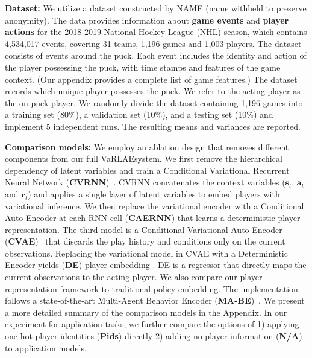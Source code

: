 \documentclass[letterpaper]{article} %
\newcommand{\state}{\mathbf{s}}
\newcommand{\action}{\mathbf{a}}
\newcommand{\reward}{\boldsymbol{r}}
\newcommand{\system}{VaRLAE\;}
\begin{document}
{\bf Dataset:} We utilize a dataset constructed by NAME (name withheld to preserve anonymity).
The data provides information about \textbf{game events} and \textbf{player actions} for the 2018-2019 National Hockey League (NHL) season,
which contains 4,534,017 events, covering 31 teams, 1,196 games and 1,003 players. 
The dataset consists of events around the puck. Each event includes the identity and action of the player possessing the puck, with time stamps and features of the game context. (Our appendix provides a complete list of game features.)
The dataset records which unique player possesses the puck. 
We refer to the acting player as the on-puck player. 
We randomly divide the dataset containing 1,196 games into a training set (80\%), a validation set (10\%), and a testing set (10\%) and implement 5 independent runs. The resulting means and variances are reported.

{\bf Comparison models:}
We employ an ablation design that removes different components from our full \system system. 
We first remove the hierarchical dependency of latent variables and train a Conditional Variational Recurrent Neural Network (\textbf{CVRNN})~\cite{ChungKDGCB15}. CVRNN concatenates the context variables ($\state_{t}$, $\action_{t}$ and $\reward_{t}$) and applies a single layer of latent variables to embed players with variational inference. We then replace the variational encoder with a Conditional Auto-Encoder at each RNN cell (\textbf{CAERNN}) that learns a deterministic player representation. 
The third model is a %
Conditional Variational Auto-Encoder (\textbf{CVAE})~\cite{WalkerDGH16} that discards the play history and conditions only on the current observations.
Replacing the variational model in CVAE with a Deterministic Encoder yields (\textbf{DE})   player embedding \cite{ganguly2018problem}. DE is %
a regressor that directly maps the current observations to the acting player. 
We also compare our player representation framework to  traditional policy embedding. The implementation follows a state-of-the-art %
Multi-Agent Behavior Encoder (\textbf{MA-BE})~\cite{GroverRepresent18}.
We present a more detailed summary of the comparison models in the Appendix.
In our experiment for application tasks,
we further compare the options of 1) applying one-hot player identities (\textbf{Pids}) directly
2) adding no player information (\textbf{N/A}) to application models.
\end{document}
